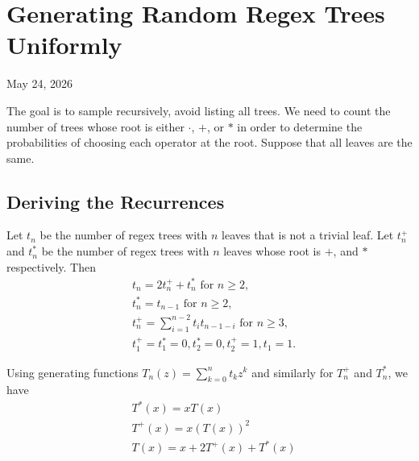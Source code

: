 \chapter{Generating Random Regex Trees Uniformly}

\begin{center}
  May 24, 2026
  \vspace{0.5cm}
\end{center}

The goal is to sample recursively, avoid listing all trees. We need to count the number of trees whose root is either $\cdot$, $+$, or $*$ in order to determine the probabilities of choosing each operator at the root. Suppose that all leaves are the same.

\section{Deriving the Recurrences}

Let $t_n$ be the number of regex trees with $n$ leaves that is not a trivial leaf. Let $t_n^+$ and $t_n^*$ be the number of regex trees with $n$ leaves whose root is $+$, and $*$ respectively. Then
\begin{align}
   & t_n = 2t_n^+ + t_n^* \text{ for } n\ge 2,                     \\
   & t_{n}^* = t_{n-1} \text{ for } n\ge 2,                        \\
   & t_{n}^+ = \sum_{i=1}^{n-2} t_i t_{n-1-i} \text{ for } n\ge 3, \\
   & t_1^+ = t_1^* = 0, t_2^*=0, t_2^+=1, t_1=1.
\end{align}

Using generating functions $T_n(z)=\sum_{k=0}^n t_k z^k$ and similarly for $T_n^+$ and $T_n^*$, we have
\begin{align*}
   & T^*(x) = xT(x)              \\
   & T^+(x) = x(T(x))^2          \\
   & T(x) = x + 2T^+(x) + T^*(x)
\end{align*}


